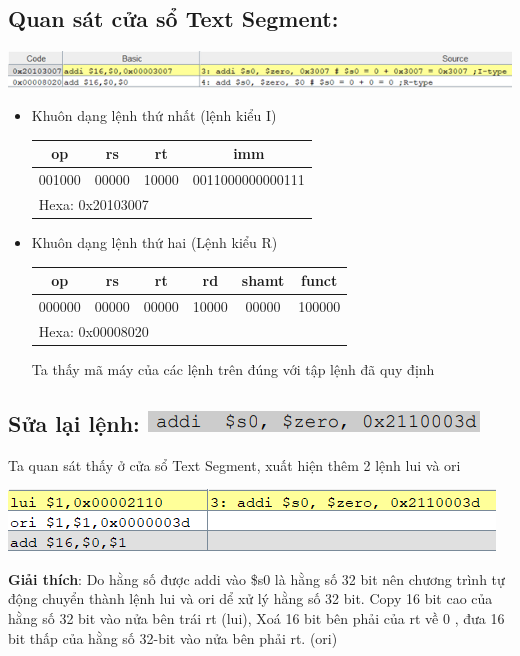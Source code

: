 \documentclass[12pt,a4paper,oneside]{article}
\begin{document}
	\subsection{Quan sát cửa sổ Text Segment:\\}
	\begin{center}
	\includegraphics[scale=1]{image/2}
	\end{center}
	
	\begin{itemize}
	\item Khuôn dạng lệnh thứ nhất (lệnh kiểu I)
	\begin{center}
	 \begin{tabular}{|c|c|c|c|}
	\hline 
	op & rs & rt & imm \\ 
	\hline 
	001000 & 00000 & 10000 & 0011000000000111 \\ 
	\hline 
	\multicolumn{4}{|l|}{Hexa: 0x20103007} \\ 
	\hline 
	\end{tabular}
	 \end{center} 
	\item Khuôn dạng lệnh thứ hai (Lệnh kiểu R)
	\begin{center}
	\begin{tabular}{|c|c|c|c|c|c|}
	\hline 
	op & rs & rt & rd & shamt & funct \\ 
	\hline 
	000000 & 00000 & 00000 & 10000 & 00000 & 100000 \\ 
	\hline 
	\multicolumn{6}{|l|}{Hexa: 0x00008020} \\ 
	\hline 
	\end{tabular} 
	\end{center}
	Ta thấy mã máy của các lệnh trên đúng với tập lệnh đã quy định
	\end{itemize}
	
	\subsection{Sửa lại lệnh: \quad\quad\quad\quad \includegraphics[scale=1]{image/3}}
		Ta quan sát thấy ở cửa sổ Text Segment, xuất hiện thêm 2 lệnh lui và ori\\ \begin{center}
		\includegraphics[scale=1]{image/4}
		\end{center}
\textbf{Giải thích}: Do hằng số được addi vào \$s0 là hằng số 32 bit nên chương trình tự động chuyển thành lệnh lui và ori dể xử lý hằng số 32 bit. Copy 16 bit cao của hằng số 32 bit vào nửa bên trái rt (lui), Xoá 16 bit bên phải của rt về 0 , đưa 16 bit thấp của hằng số 32-bit vào nửa bên phải rt. (ori)
\pagebreak
\end{document}

